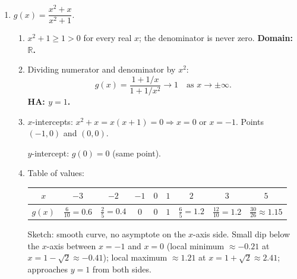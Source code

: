 \documentclass[12pt, twoside]{article}
\begin{document}
\begin{enumerate}[itemsep=0.3cm]
\begin{enumerate}[label=(\alph*), itemsep=0.2cm]
  \item With $a=-1$: $f_{-1}(x)=\dfrac{x-2}{x+1}$. VA $x=-1$; HA $y=1$;
  $y$-intercept $f_{-1}(0)=-2/1=-2$. $x$-intercept at $x=2$ (the shared
  point from (c)).

  Left branch ($x<-1$): from $1^+$ at $-\infty$ up to $+\infty$ at $-1^-$;
  passes through $(-2,4)$.

  Right branch ($x>-1$): from $-\infty$ at $-1^+$ up through $(0,-2)$,
  $(2,0)$, approaching $y=1$ from below.
\end{enumerate}

\newpage

\item $\displaystyle g(x)=\dfrac{x^2+x}{x^2+1}$.

\begin{enumerate}[label=(\alph*), itemsep=0.2cm]
  \item $x^2+1\ge 1>0$ for every real $x$; the denominator is never zero.
  \textbf{Domain: $\mathbb{R}$.}

  \item Dividing numerator and denominator by $x^2$:
  \[
  g(x)=\dfrac{1+1/x}{1+1/x^2}\to 1\quad\text{as }x\to\pm\infty.
  \]
  \textbf{HA: $y=1$.}

  \item $x$-intercepts: $x^2+x=x(x+1)=0\Rightarrow x=0$ or $x=-1$. Points
  $(-1,0)$ and $(0,0)$.

  $y$-intercept: $g(0)=0$ (same point).

  \item Table of values:
  \begin{center}
  \begin{tabular}{|c|c|c|c|c|c|c|c|c|}
  \hline
  $x$    & $-3$ & $-2$ & $-1$ & $0$ & $1$ & $2$ & $3$ & $5$ \\
  \hline
  $g(x)$ & $\tfrac{6}{10}=0.6$ & $\tfrac{2}{5}=0.4$ & $0$ & $0$ & $1$ & $\tfrac{6}{5}=1.2$ & $\tfrac{12}{10}=1.2$ & $\tfrac{30}{26}\approx 1.15$ \\
  \hline
  \end{tabular}
  \end{center}

  Sketch: smooth curve, no asymptote on the $x$-axis side. Small dip below the
  $x$-axis between $x=-1$ and $x=0$ (local minimum $\approx-0.21$ at
  $x=1-\sqrt 2\approx-0.41$); local maximum $\approx 1.21$ at
  $x=1+\sqrt 2\approx 2.41$; approaches $y=1$ from both sides.
\end{enumerate}


\end{enumerate}
\end{document}
